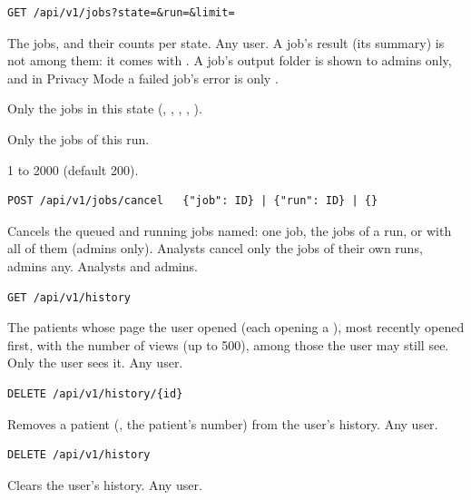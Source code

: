 \begin{lstlisting}[style=signature]
GET /api/v1/jobs?state=&run=&limit=
\end{lstlisting}
The jobs, and their counts per state. Any user. A job's result (its summary) is not among
them: it comes with . A job's output folder is shown to admins only,
and in Privacy Mode a failed job's error is only .
\begin{params}
\item[state] Only the jobs in this state (, , ,
  , ).
\item[run] Only the jobs of this run.
\item[limit] 1 to 2000 (default 200).
\end{params}

\begin{lstlisting}[style=signature]
POST /api/v1/jobs/cancel   {"job": ID} | {"run": ID} | {}
\end{lstlisting}
Cancels the queued and running jobs named: one job, the jobs of a run, or with \code{\{\}} all
of them (admins only). Analysts cancel only the jobs of their own runs, admins any. Analysts and
admins.

\begin{lstlisting}[style=signature]
GET /api/v1/history
\end{lstlisting}
The patients whose page the user opened (each opening a ), most
recently opened first, with the number of views (up to 500), among those the user may still see.
Only the user sees it. Any user.

\begin{lstlisting}[style=signature]
DELETE /api/v1/history/{id}
\end{lstlisting}
Removes a patient (, the patient's number) from the user's history. Any user.

\begin{lstlisting}[style=signature]
DELETE /api/v1/history
\end{lstlisting}
Clears the user's history. Any user.

